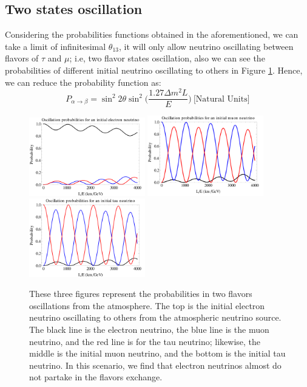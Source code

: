 \documentclass[12pt]{article}
\begin{document}
\begin{multicols}{2}
    \subsection{Two states oscillation}
        Considering the probabilities functions obtained in the aforementioned, we can take a limit of infinitesimal $\theta_{13}$, it will only allow neutrino oscillating between flavors of $\tau$ and $\mu$; i.e, two flavor states oscillation, also we can see the probabilities of different initial neutrino oscillating to others in Figure \ref{NeuOsci}. Hence, we can reduce the probability function as:
        \[
            P_{\alpha \rightarrow \beta} = \sin^{2} 2\theta \sin^{2} \Big( \frac{1.27 \Delta m^{2}L}{E} \Big)\ \Big[ \text{Natural Units} \Big]
        \] 
        \begin{figure}[H]
            \centering 
            \includegraphics[width = 0.45\textwidth]{../figure/e.png}  
            \includegraphics[width = 0.45\textwidth]{../figure/mu.png}  
            \includegraphics[width = 0.45\textwidth]{../figure/tau.png}  
            \caption{These three figures represent the probabilities in two flavors oscillations from the atmosphere. The top is the initial electron neutrino oscillating to others from the atmospheric neutrino source. The black line is the electron neutrino, the blue line is the muon neutrino, and the red line is for the tau neutrino; likewise, the middle is the initial muon neutrino, and the bottom is the initial tau neutrino. In this scenario, we find that electron neutrinos almost do not partake in the flavors exchange. \cite{wiki}}
            \label{NeuOsci}
        \end{figure}


\end{multicols}
\end{document}
